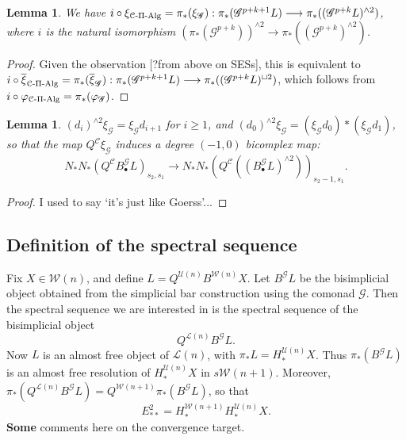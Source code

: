 \documentclass[11pt]{amsart}
\theoremstyle{plain}
\newtheorem{lem}[thm]{Lemma}
\theoremstyle{definition}
\let\phi\varphi
\renewcommand{\to}{\longrightarrow}
\newcommand{\scrQ}{\mathscr{Q}}
\newcommand{\scrR}{\mathscr{R}}
\newcommand{\scrT}{\mathscr{T}}
\newcommand{\scrY}{\mathscr{Y}}
\newcommand{\scrI}{\mathscr{I}}
\newcommand{\scrO}{\mathscr{O}}
\newcommand{\scrP}{\mathscr{P}}
\newcommand{\scrS}{\mathscr{S}}
\newcommand{\scrG}{\mathscr{G}}
\newcommand{\scrH}{\mathscr{H}}
\newcommand{\scrJ}{\mathscr{J}}
\newcommand{\scrK}{\mathscr{K}}
\newcommand{\scrL}{\mathscr{L}}
\newcommand{\scrZ}{\mathscr{Z}}
\newcommand{\scrN}{\mathscr{N}}
\newcommand{\scrM}{\mathscr{M}}
\newcommand{\calW}{\mathcal{W}}
\newcommand{\calU}{\mathcal{U}}
\newcommand{\calL}{\mathcal{L}}
\newcommand{\calC}{\mathcal{C}}
\theoremstyle{plain}
\newcommand{\BSW}{{\scrG}}%
\newcommand{\BSWres}{B^\BSW}%
\newcommand{\PiAlg}{\textup{-$\Pi$-Alg}}
\begin{document}
\begin{Composite functor spectral sequences}
\begin{lem}\label{LemmaOn xi}
We have $i\circ \xi_{\calC\PiAlg}=\pi_*(\xi_{\BSW}):\pi_*(\BSW^{p+k+1}L)\to\pi_*((\BSW^{p+k}L)^{\wedge 2})$, where $i$ is the natural isomorphism $(\pi_*(\BSW^{p+k}))^{\wedge 2}\to \pi_*((\BSW^{p+k})^{\wedge 2})$.
\end{lem}
\begin{proof}
Given the observation [?from above on SESs], this is equivalent to $i\circ \overline{\xi}_{\calC\PiAlg}=\pi_*(\overline{\xi}_{\BSW}):\pi_*(\BSW^{p+k+1}L)\to\pi_*((\BSW^{p+k}L)^{\sqcup 2})$, which follows from $i\circ\phi_{\calC\PiAlg}=\pi_*(\phi_{\BSW})$.
\end{proof}
%
%
%
%
%
%
%



\begin{lem}
$(d_i)^{\wedge 2}\xi_\BSW =\xi_\BSW d_{i+1}$ for $i\geq1$, and $(d_0)^{\wedge 2}\xi_\BSW = (\xi_\BSW d_{0})*(\xi_\BSW d_{1})$, so that the map $Q^{\calC}\xi_\BSW $ induces a degree $(-1,0)$ bicomplex map:
\[N_*N_*(Q^{\calC}B^\BSW_{\bullet}L)_{s_2,s_1}\to
  N_*N_*(Q^{\calC}((B^\BSW_{\bullet}L)^{\wedge 2}))_{s_2-1,s_1}.\]
\end{lem}
\begin{proof}
I used to say `it's just like Goerss'...
\end{proof}

\subsection{Definition of the spectral sequence}
Fix $X\in\calW(n)$, and define $L=Q^{\calU(n)}B^{\calW(n)}X$. Let $\BSWres L$ be the bisimplicial object obtained from the simplicial bar construction using the comonad $\BSW$. Then the spectral sequence we are interested in is the spectral sequence of the bisimplicial object
\[Q^{\calL(n)}\BSWres L.\]
Now $L$ is an almost free object of $\calL(n)$, with $\pi_*L=H_*^{\calU(n)}X$. Thus $\pi_*(\BSWres L)$ is an almost free resolution of $H_*^{\calU(n)}X$ in $s\calW(n+1)$. Moreover, $\pi_*(Q^{\calL(n)}\BSWres L)=Q^{\calW(n+1)}\pi_*(\BSWres L)$, so that
\[E^2_{**}=H_*^{\calW(n+1)}H_*^{\calU(n)}X.\]
\textbf{Some} comments here on the convergence target.


\end{Composite functor spectral sequences}
\end{document}
